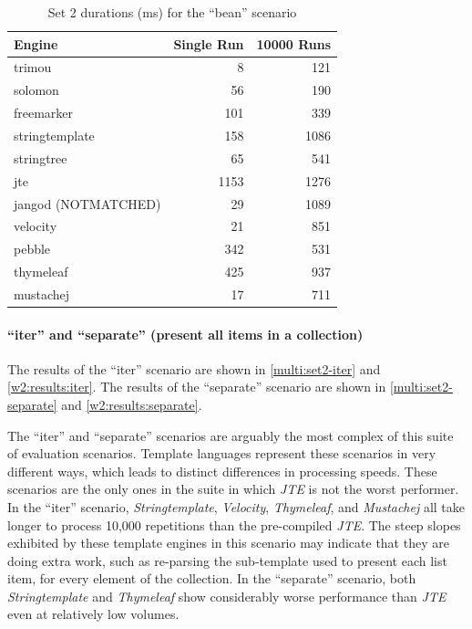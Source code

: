 \begin{table}[!p]
\centering
\begin{tabular}{lrr}
\textbf{Engine} & \textbf{Single Run} & \textbf{10000 Runs} \\
\hline
trimou & 8 & 121 \\
solomon & 56 & 190 \\
freemarker & 101 & 339 \\
stringtemplate & 158 & 1086 \\
stringtree & 65 & 541 \\
jte & 1153 & 1276 \\
jangod (NOTMATCHED) & 29 & 1089 \\
velocity & 21 & 851 \\
pebble & 342 & 531 \\
thymeleaf & 425 & 937 \\
mustachej & 17 & 711 \\
\end{tabular}
\caption{Set 2 durations (ms) for the \enquote{bean} scenario\label{w2:results:bean}}
\end{table}

\paragraph{\enquote{iter} and \enquote{separate} (present all items in a collection)}

The results of the \enquote{iter} scenario are shown in \autoref{multi:set2-iter} and \autoref{w2:results:iter}. The results of the \enquote{separate} scenario are shown in \autoref{multi:set2-separate} and \autoref{w2:results:separate}.

The \enquote{iter} and \enquote{separate} scenarios are arguably the most complex of this suite of evaluation scenarios. Template languages represent these scenarios in very different ways, which leads to distinct differences in processing speeds. These scenarios are the only ones in the suite in which \emph{JTE} is not the worst performer.  In the \enquote{iter} scenario, \emph{Stringtemplate}, \emph{Velocity}, \emph{Thymeleaf}, and \emph{Mustachej} all take longer to process 10,000 repetitions than the pre-compiled \emph{JTE}. The steep slopes exhibited by these \gls{template engine}s in this scenario may indicate that they are doing extra work, such as re-parsing the sub-template used to present each list item, for every element of the collection. In the \enquote{separate} scenario, both \emph{Stringtemplate} and \emph{Thymeleaf} show considerably worse performance than \emph{JTE} even at relatively low volumes.

